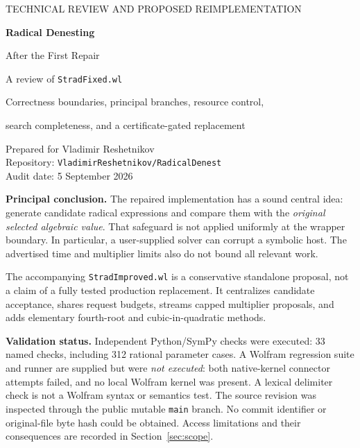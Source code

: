 \documentclass[11pt,letterpaper]{article}
\newcommand{\code}[1]{\texttt{#1}}
\theoremstyle{definition}
\begin{document}
\begin{titlepage}
\vspace*{.55in}
{\color{teal}\large TECHNICAL REVIEW AND PROPOSED REIMPLEMENTATION\par}
\vspace{.25in}
{\color{navy}\Huge\bfseries Radical Denesting\par}
\vspace{.1in}
{\color{navy}\LARGE After the First Repair\par}
\vspace{.25in}
{\Large A review of \texttt{StradFixed.wl}\par}
\vspace{.15in}
{\large Correctness boundaries, principal branches, resource control,\par
 search completeness, and a certificate-gated replacement\par}
\vspace{.35in}
Prepared for Vladimir Reshetnikov\\
Repository: \texttt{VladimirReshetnikov/RadicalDenest}\\
Audit date: 5 September 2026
\vspace{.35in}
\begin{notice}
\textbf{Principal conclusion.} The repaired implementation has a sound central idea: generate candidate radical expressions and compare them with the \emph{original selected algebraic value}. That safeguard is not applied uniformly at the wrapper boundary. In particular, a user-supplied solver can corrupt a symbolic host. The advertised time and multiplier limits also do not bound all relevant work.

The accompanying \code{StradImproved.wl} is a conservative standalone proposal, not a claim of a fully tested production replacement. It centralizes candidate acceptance, shares request budgets, streams capped multiplier proposals, and adds elementary fourth-root and cubic-in-quadratic methods.
\end{notice}
\vspace{.12in}
\textbf{Validation status.} Independent Python/SymPy checks were executed: 33 named checks, including 312 rational parameter cases. A Wolfram regression suite and runner are supplied but were \emph{not executed}: both native-kernel connector attempts failed, and no local Wolfram kernel was present. A lexical delimiter check is not a Wolfram syntax or semantics test.
\vfill
{\small The source revision was inspected through the public mutable \code{main} branch. No commit identifier or original-file byte hash could be obtained. Access limitations and their consequences are recorded in Section~\ref{sec:scope}.}
\end{titlepage}
\end{document}
